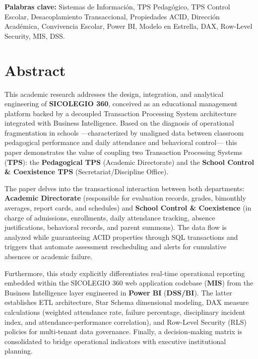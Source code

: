 \documentclass[12pt,a4paper,oneside]{report}
\begin{document}
    \textbf{Palabras clave:} Sistemas de Información, TPS Pedagógico, TPS Control Escolar, Desacoplamiento Transaccional, Propiedades ACID, Dirección Académica, Convivencia Escolar, Power BI, Modelo en Estrella, DAX, Row-Level Security, MIS, DSS.

    \chapter*{Abstract}

    This academic research addresses the design, integration, and analytical engineering of \textbf{SICOLEGIO 360}, conceived as an educational management platform backed by a decoupled Transaction Processing System architecture integrated with Business Intelligence. Based on the diagnosis of operational fragmentation in schools —characterized by unaligned data between classroom pedagogical performance and daily attendance and behavioral control— this paper demonstrates the value of coupling two Transaction Processing Systems (\textbf{TPS}): the \textbf{Pedagogical TPS} (Academic Directorate) and the \textbf{School Control & Coexistence TPS} (Secretariat/Discipline Office).

    The paper delves into the transactional interaction between both departments: \textbf{Academic Directorate} (responsible for evaluation records, grades, bimonthly averages, report cards, and schedules) and \textbf{School Control & Coexistence} (in charge of admissions, enrollments, daily attendance tracking, absence justifications, behavioral records, and parent summons). The data flow is analyzed while guaranteeing ACID properties through SQL transactions and triggers that automate assessment rescheduling and alerts for cumulative absences or academic failure.

    Furthermore, this study explicitly differentiates real-time operational reporting embedded within the SICOLEGIO 360 web application codebase (\textbf{MIS}) from the Business Intelligence layer engineered in \textbf{Power BI} (\textbf{DSS/BI}). The latter establishes ETL architecture, Star Schema dimensional modeling, DAX measure calculations (weighted attendance rate, failure percentage, disciplinary incident index, and attendance-performance correlation), and Row-Level Security (RLS) policies for multi-tenant data governance. Finally, a decision-making matrix is consolidated to bridge operational indicators with executive institutional planning.
\end{document}
